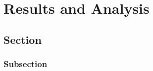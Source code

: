 \chapter{Results and Analysis}\label{chapter:ResultsAndAnalysis}

\section{Section}

\subsection{Subsection}